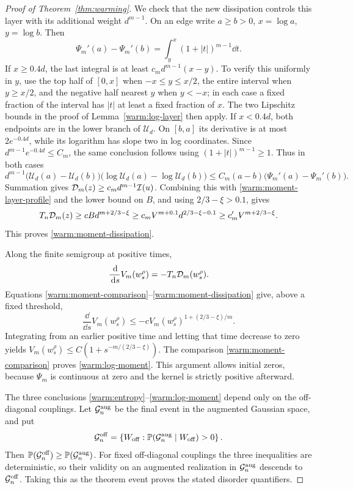 \begin{proof}[Proof of Theorem~\ref{thm:warming}]
We check that the new dissipation controls this layer with its
additional weight \(d^{m-1}\).  On an edge write
\(a\ge b>0\), \(x=\log a\), \(y=\log b\).  Then
\[
 \Psi_m'(a)-\Psi_m'(b)
       =\int_y^x(1+|t|)^{m-1}\dd t.
\]
If \(x\ge0.4d\), the last integral is at least
\(c_m d^{m-1}(x-y)\).  To verify this uniformly in \(y\), use the
top half of \([0,x]\) when \(-x\le y\le x/2\), the entire interval
when \(y\ge x/2\), and the negative half nearest \(y\) when
\(y<-x\); in each case a fixed fraction of the interval has
\(|t|\) at least a fixed fraction of \(x\).  The two
Lipschitz bounds in the proof of Lemma~\ref{warm:log-layer} then apply.
If \(x<0.4d\), both endpoints are in the lower branch of
\(\mathcal U_d\).  On \([b,a]\) its derivative is at most
\(2e^{-0.4d}\), while its logarithm has slope two in log
coordinates.  Since \(d^{m-1}e^{-0.4d}\le C_m\), the same
conclusion follows using \((1+|t|)^{m-1}\ge1\).
Thus in both cases
\[
 d^{m-1}\bigl(\mathcal U_d(a)-\mathcal U_d(b)\bigr)
       \bigl(\log\mathcal U_d(a)-\log\mathcal U_d(b)\bigr)
 \le C_m(a-b)\bigl(\Psi_m'(a)-\Psi_m'(b)\bigr).
\]
Summation gives
\(\mathcal D_m(z)\ge c_m d^{m-1}\mathcal I(u)\).
Combining this with \eqref{warm:moment-layer-profile} and the
lower bound on \(B\), and using \(2/3-\xi>0.1\), gives
\[
 T_n\mathcal D_m(z)
 \ge cB d^{m+2/3-\xi}
 \ge c_m V^{m+0.1}d^{2/3-\xi-0.1}
 \ge c_m' V^{m+2/3-\xi}.
\]
This proves \eqref{warm:moment-dissipation}.

Along the finite semigroup at positive times,
\[
 \frac{\,\mathrm d}{\,\mathrm d s}V_m(w_s^\rho)
       =-T_n\mathcal D_m(w_s^\rho).
\]
Equations \eqref{warm:moment-comparison}--\eqref{warm:moment-dissipation}
give, above a fixed threshold,
\[
 \frac{\dd}{\dd s}V_m(w_s^\rho)
       \le-c V_m(w_s^\rho)^{1+(2/3-\xi)/m}.
\]
Integrating from an earlier positive time and letting that time
decrease to zero yields
\(V_m(w_s^\rho)\le C(1+s^{-m/(2/3-\xi)})\).
The comparison \eqref{warm:moment-comparison} proves
\eqref{warm:log-moment}.  This argument allows initial zeros,
because \(\Psi_m\) is continuous at zero and the kernel is strictly
positive afterward.

The three conclusions \eqref{warm:entropy}--\eqref{warm:log-moment}
depend only on the off-diagonal couplings.  Let \(\mathcal G_n^{\rm aug}\)
be the final event in the augmented Gaussian space, and put
\[
 \mathcal G_n^{\rm off}
 =\left\{W_{\rm off}:
       \mathbb P(\mathcal G_n^{\rm aug}\mid W_{\rm off})>0\right\}.
\]
Then \(\mathbb P(\mathcal G_n^{\rm off})\ge
\mathbb P(\mathcal G_n^{\rm aug})\).  For fixed off-diagonal couplings the
three inequalities are deterministic, so their validity on an augmented
realization in \(\mathcal G_n^{\rm aug}\) descends to
\(\mathcal G_n^{\rm off}\).  Taking this as the
theorem event proves the stated disorder quantifiers.
\end{proof}

